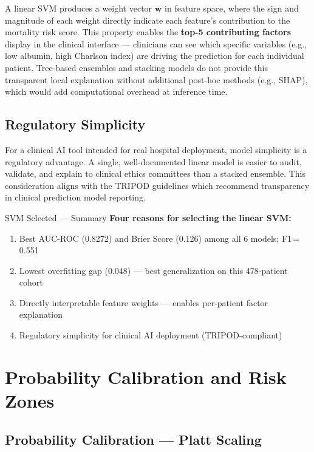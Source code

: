 \documentclass[12pt,a4paper,twoside]{report}
\begin{document}
A linear SVM produces a weight vector $\mathbf{w}$ in feature space, where the sign and magnitude of each weight directly indicate each feature's contribution to the mortality risk score. This property enables the \textbf{top-5 contributing factors} display in the clinical interface — clinicians can see which specific variables (e.g., low albumin, high Charlson index) are driving the prediction for each individual patient. Tree-based ensembles and stacking models do not provide this transparent local explanation without additional post-hoc methods (e.g., SHAP), which would add computational overhead at inference time.

\subsection{Regulatory Simplicity}

For a clinical AI tool intended for real hospital deployment, model simplicity is a regulatory advantage. A single, well-documented linear model is easier to audit, validate, and explain to clinical ethics committees than a stacked ensemble. This consideration aligns with the TRIPOD guidelines \cite{collins_tripod_2015} which recommend transparency in clinical prediction model reporting.

\begin{resultbox}{SVM Selected — Summary}
\textbf{Four reasons for selecting the linear SVM:}
\begin{enumerate}[noitemsep]
  \item Best AUC-ROC (0.8272) and Brier Score (0.126) among all 6 models; F1\,=\,0.551
  \item Lowest overfitting gap (0.048) — best generalization on this 478-patient cohort
  \item Directly interpretable feature weights — enables per-patient factor explanation
  \item Regulatory simplicity for clinical AI deployment (TRIPOD-compliant)
\end{enumerate}
\end{resultbox}

\section{Probability Calibration and Risk Zones}
\label{sec:calibration}

\subsection{Probability Calibration — Platt Scaling}
\end{document}
